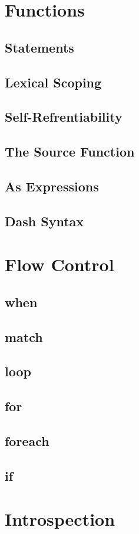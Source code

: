\documentclass[12pt,letterpaper]{report}
\begin{document}
\chapter{Functions}
\section{Statements}
\section{Lexical Scoping}
\section{Self-Refrentiability}
\section{The Source Function}
\section{As Expressions}
\section{Dash Syntax}
\chapter{Flow Control}
\section{when}
\section{match}
\section{loop}
\section{for}
\section{foreach}
\section{if}
\chapter{Introspection}
\end{document}
